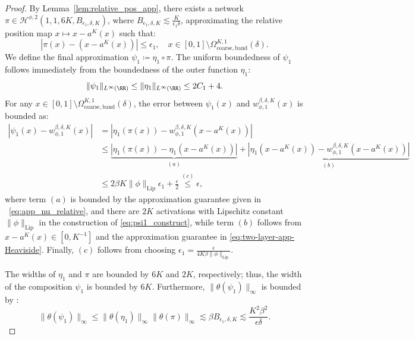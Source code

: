 \documentclass[11pt]{article}
\begin{document}
\begin{proof}
    By Lemma~\ref{lem:relative_pos_app}, there exists a network $\pi \in \mathcal{H}^{\phi,2}(1,1,6K,B_{\epsilon_1, {\delta}, K})$, where $B_{\epsilon_1, {\delta}, K} \lesssim \frac{K}{\epsilon_1 {\delta}}$, approximating the relative position map $x \mapsto x - a^K(x)$ such that:
    \begin{equation}
        |\pi(x) - (x - a^K(x))| \leq \epsilon_1, \quad x \in [0,1] \setminus \Omega_{\mathrm{coarse,band}}^{K, 1} ({\delta}).
        \label{eq:app_nu_relative}
    \end{equation}
    We define the final approximation $\psi_1 \coloneqq \eta_1 \circ \pi$.  The uniform boundedness of $\psi_1$ follows immediately from the boundedness of the outer function $\eta_1$:
    \begin{equation*}
        \|\psi_1\|_{L^{\infty}(\RR)} \leq \|\eta_1\|_{L^{\infty}(\RR)} \leq 2C_1 + 4.
    \end{equation*}
     For any $x \in [0,1] \setminus \Omega_{\mathrm{coarse,band}}^{K, 1} ({\delta})$, the  error between $\psi_1(x)$ and $w_{\phi,1}^{\beta, \delta, K}(x)$ is bounded as:
    \begin{equation*}
        \begin{aligned}
            |\psi_1(x) - w_{\phi,1}^{\beta, \delta, K}(x)| & = |\eta_1(\pi(x)) - w_{\phi,1}^{\beta, \delta, K}(x - a^K(x))| \\
            & \leq \underbrace{|\eta_1 (\pi(x)) - \eta_1(x- a^K(x))|}_{(a)}  + \underbrace{|\eta_1(x - a^K(x)) - w_{\phi,1}^{\beta, \delta,K}(x - a^K(x)) |}_{(b)}\\
            & \leq 2 \beta K \|\phi\|_{\mathrm{Lip}} \epsilon_1 + \frac{\epsilon}{2} \overset{(c)}{\leq} \epsilon,
        \end{aligned}
    \end{equation*}
    where term $(a)$ is bounded by the approximation guarantee given in ~\eqref{eq:app_nu_relative}, and there are $2K$ activations with Lipschitz constant $\|\phi\|_{\mathrm{Lip}}$ in the construction of \eqref{eq:psi1_construct}, while term $(b)$ follows from $x - a^K(x) \in [0, K^{-1}]$ and the approximation guarantee in \eqref{eq:two-layer-app-Heaviside}. Finally, $(c)$ follows from choosing $\epsilon_1 = \frac{\epsilon}{4K \beta \|\phi\|_{\mathrm{Lip}}}$.


    The widths of $\eta_1$ and $\pi$ are bounded by $6K$ and $2K$, respectively; thus, the width of the composition $\psi_1$ is bounded by $6K$. Furthermore, $\|\theta(\psi_1)\|_{\infty}$ is bounded by :
    \begin{equation*}
        \|\theta(\psi_1)\|_{\infty} \leq \|\theta(\eta_1)\|_{\infty} \|\theta(\pi)\|_{\infty} \lesssim \beta B_{\epsilon_1, {\delta},K} \lesssim \frac{K^2 \beta^2}{\epsilon {\delta}}.
    \end{equation*}



\end{proof}
\end{document}
